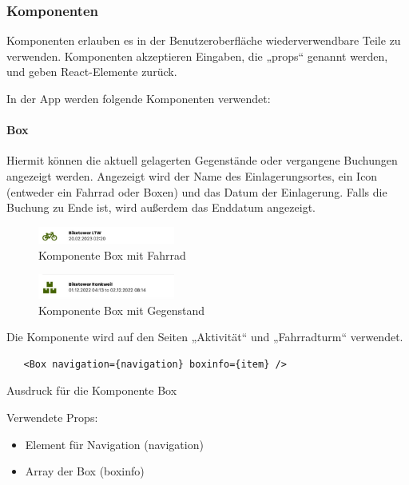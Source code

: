 \subsubsection{Komponenten}
Komponenten erlauben es in der Benutzeroberfläche wiederverwendbare Teile zu verwenden. Komponenten akzeptieren Eingaben, die „props“ genannt werden, und geben React-Elemente zurück. 

\bigskip

\noindent In der App werden folgende Komponenten verwendet:

\paragraph{Box}

Hiermit können die aktuell gelagerten Gegenstände oder vergangene Buchungen angezeigt werden. Angezeigt wird der Name des Einlagerungsortes, ein Icon (entweder ein Fahrrad oder Boxen) und das Datum der Einlagerung. Falls die Buchung zu Ende ist, wird außerdem das Enddatum angezeigt.

\begin{figure}[H]
  \centering
  \includegraphics[width=0.4\textwidth]{images/app-screenshots/boxwithbike.png}
  \caption{Komponente Box mit Fahrrad}
  \label{fig:boxwithbike}
\end{figure}
\begin{figure}[H]
  \centering
  \includegraphics[width=0.4\textwidth]{images/app-screenshots/boxwithitem.png}
  \caption{Komponente Box mit Gegenstand}
  \label{fig:boxwithitem}
\end{figure}

Die Komponente wird auf den Seiten „Aktivität“ und „Fahrradturm“ verwendet.

\begin{listing}[H]
  \begin{verbatim}
   <Box navigation={navigation} boxinfo={item} />
\end{verbatim}
  \caption{Ausdruck für die Komponente Box}
  \label{lst:jsxbox}
\end{listing}

Verwendete Props:
\begin{itemize}
  \item Element für Navigation (navigation)
  \item \Gls{Array} der Box (boxinfo)
\end{itemize}

